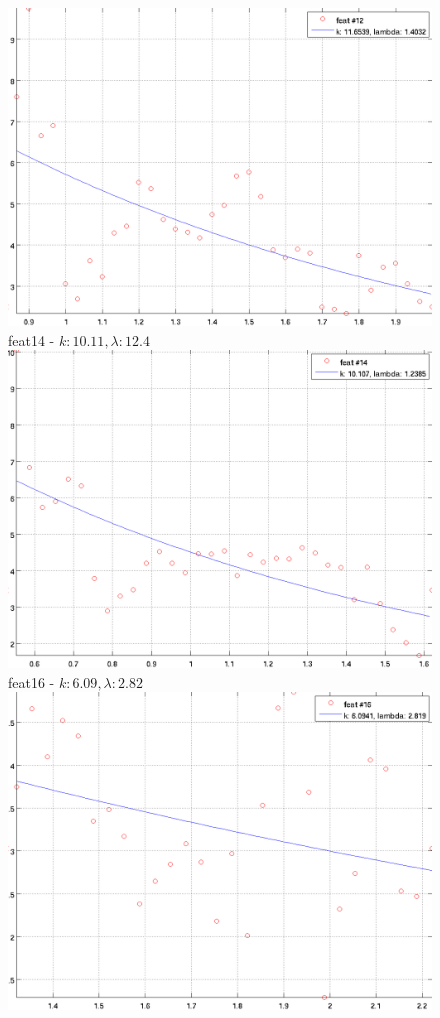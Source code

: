 \documentclass[12pt]{report}
\begin{document}
\begin{figure}[H]
\begin{minipage}[t]{0.5\linewidth}
	\includegraphics[scale=\imFeat]{images/feat12}\\
	feat14 - $k: 10.11, \lambda: 12.4 $\\
	\includegraphics[scale=\imFeat]{images/feat14}\\
	feat16 - $k: 6.09, \lambda: 2.82 $\\
	\includegraphics[scale=\imFeat]{images/feat16}\\

\end{minipage}
\end{figure}
\end{document}
